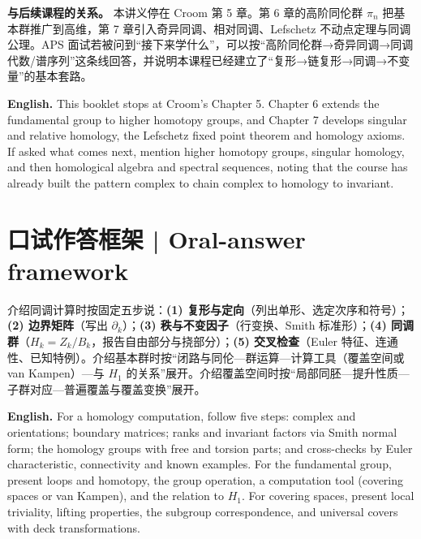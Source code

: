 \documentclass[UTF8,11pt,a4paper]{ctexart}
\newcommand{\EN}[1]{\par\noindent\textbf{English.} #1\par}
\begin{document}
\noindent\textbf{与后续课程的关系。} 本讲义停在 Croom 第 5 章。第 6 章的高阶同伦群 $\pi_n$ 把基本群推广到高维，第 7 章引入奇异同调、相对同调、Lefschetz 不动点定理与同调公理。APS 面试若被问到“接下来学什么”，可以按“高阶同伦群→奇异同调→同调代数/谱序列”这条线回答，并说明本课程已经建立了“复形→链复形→同调→不变量”的基本套路。
\EN{This booklet stops at Croom's Chapter 5. Chapter 6 extends the fundamental group to higher homotopy groups, and Chapter 7 develops singular and relative homology, the Lefschetz fixed point theorem and homology axioms. If asked what comes next, mention higher homotopy groups, singular homology, and then homological algebra and spectral sequences, noting that the course has already built the pattern complex to chain complex to homology to invariant.}

\section*{口试作答框架 | Oral-answer framework}
\noindent 介绍同调计算时按固定五步说：\textbf{(1) 复形与定向}（列出单形、选定次序和符号）；\textbf{(2) 边界矩阵}（写出 $\partial_k$）；\textbf{(3) 秩与不变因子}（行变换、Smith 标准形）；\textbf{(4) 同调群}（$H_k=Z_k/B_k$，报告自由部分与挠部分）；\textbf{(5) 交叉检查}（Euler 特征、连通性、已知特例）。介绍基本群时按“闭路与同伦—群运算—计算工具（覆盖空间或 van Kampen）—与 $H_1$ 的关系”展开。介绍覆盖空间时按“局部同胚—提升性质—子群对应—普遍覆盖与覆盖变换”展开。
\EN{For a homology computation, follow five steps: complex and orientations; boundary matrices; ranks and invariant factors via Smith normal form; the homology groups with free and torsion parts; and cross-checks by Euler characteristic, connectivity and known examples. For the fundamental group, present loops and homotopy, the group operation, a computation tool (covering spaces or van Kampen), and the relation to $H_1$. For covering spaces, present local triviality, lifting properties, the subgroup correspondence, and universal covers with deck transformations.}
\end{document}
